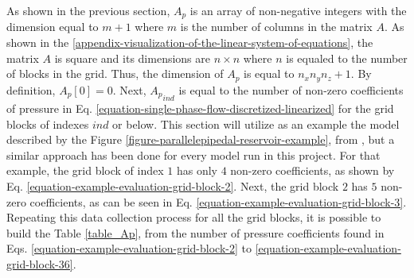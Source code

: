 As shown in the previous section, $A_p$ is an array of non-negative integers with the dimension equal to $m + 1$ where $m$ is the number of columns in the matrix $A$. 
%
As shown in the \ref{appendix-visualization-of-the-linear-system-of-equations}, the matrix $A$ is square and its dimensions are $n \times n$ where $n$ is equaled to the number of blocks in the grid. 
%
Thus, the dimension of $A_p$ is equal to $n_x n_y n_z + 1$. 
%
By definition, ${A_p}[0] = 0$. 
%
Next, ${A_p}_{ind}$ is equal to the number of non-zero coefficients of pressure in Eq. \ref{equation-single-phase-flow-discretized-linearized} for the grid blocks of indexes $ind$ or below. 
%
This section will utilize as an example the model described by the Figure \ref{figure-parallelepipedal-reservoir-example}, from \cite{Ertekin2001}, but a similar approach has been done for every model run in this project. 
%
For that example, the grid block of index $1$ has only $4$ non-zero coefficients, as shown by Eq. \ref{equation-example-evaluation-grid-block-2}. 
%
Next, the grid block $2$ has $5$ non-zero coefficients, as can be seen in Eq. \ref{equation-example-evaluation-grid-block-3}. 
%
Repeating this data collection process for all the grid blocks, it is possible to build the Table \ref{table_Ap}, from the number of pressure coefficients found in Eqs. \ref{equation-example-evaluation-grid-block-2} to \ref{equation-example-evaluation-grid-block-36}.
%
